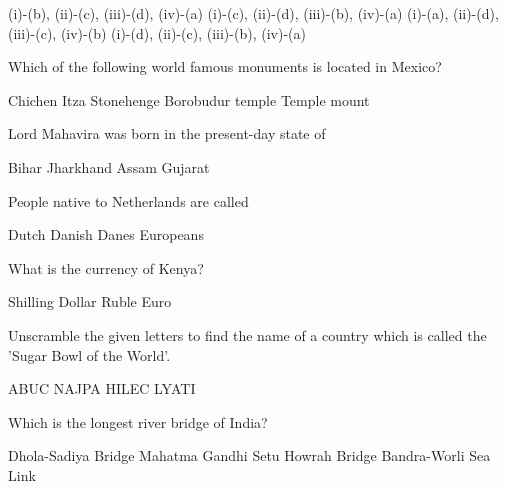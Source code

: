 \begin{questions}
    \begin{randomizechoices}
        \CorrectChoice (i)-(b), (ii)-(c), (iii)-(d), (iv)-(a)
        \choice (i)-(c), (ii)-(d), (iii)-(b), (iv)-(a)
        \choice (i)-(a), (ii)-(d), (iii)-(c), (iv)-(b)
        \choice (i)-(d), (ii)-(c), (iii)-(b), (iv)-(a)
    \end{randomizechoices}

    \question Which of the following world famous monuments is located in Mexico?

    \begin{randomizechoices}
        \CorrectChoice Chichen Itza
        \choice Stonehenge
        \choice Borobudur temple
        \choice Temple mount
    \end{randomizechoices}

    \question Lord Mahavira was born in the present-day state of \fillin

    \begin{randomizeoneparchoices}
        \CorrectChoice Bihar
        \choice Jharkhand
        \choice Assam
        \choice Gujarat
    \end{randomizeoneparchoices}

    \question People native to Netherlands are called \fillin

    \begin{randomizeoneparchoices}
        \CorrectChoice Dutch
        \choice Danish
        \choice Danes
        \choice Europeans
    \end{randomizeoneparchoices}

    \question What is the currency of Kenya?

    \begin{randomizeoneparchoices}
        \CorrectChoice Shilling
        \choice Dollar
        \choice Ruble
        \choice Euro
    \end{randomizeoneparchoices}

\question Unscramble the given letters to find the name of a country which is called the 'Sugar Bowl of the World'.

    \begin{randomizeoneparchoices}
        \CorrectChoice ABUC
        \choice NAJPA
        \choice HILEC
        \choice LYATI
    \end{randomizeoneparchoices}

    \question Which is the longest river bridge of India?

    \begin{randomizechoices}
        \CorrectChoice Dhola-Sadiya Bridge
        \choice Mahatma Gandhi Setu
        \choice Howrah Bridge
        \choice Bandra-Worli Sea Link
    \end{randomizechoices}

\end{questions}


